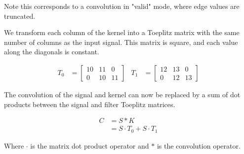 Note this corresponds to a convolution in "valid" mode, where edge values are truncated.

We transform each column of the kernel into a Toeplitz matrix with the same number of columns as the input signal. This matrix is square, and each value along the diagonals is constant.

\begin{align}
    T_0 &=
    \begin{bmatrix}
        10 & 11 & 0 \\
        0  & 10 & 11
    \end{bmatrix} &
    T_1 &=
    \begin{bmatrix}
        12 & 13 & 0 \\
        0  & 12 & 13
    \end{bmatrix}
\end{align}

The convolution of the signal and kernel can now be replaced by a sum of dot products between the signal and filter Toeplitz matrices.

\begin{align}
    C &= S * K \\
      &= S \cdot T_0 + S \cdot T_1
\end{align}

Where $\cdot$ is the matrix dot product operator and $*$ is the convolution operator.